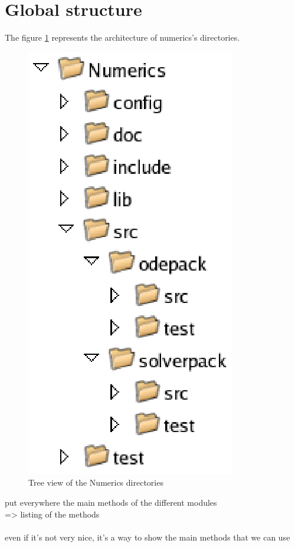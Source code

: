 \section{Global structure}
The figure \ref{fig: Tree view of the Numerics directories} represents the architecture of \ac{numerics}'s directories.
	\begin{figure}
	\begin{center}
	\includegraphics[scale=1.2, clip]{figure/NumericsDesign.eps}
	\caption{Tree view of the Numerics directories}
	\label{fig: Tree view of the Numerics directories}
	\end{center}
	\end{figure}




\begin{ndr}
put everywhere the main methods of the different modules\\
=> listing of the methods\\
\\
even if it's not very nice, it's a way to show the main methods that we can use
\end{ndr}


